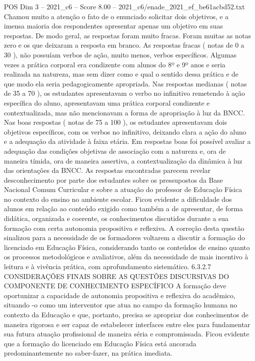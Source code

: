 \begin{textsample}{POS Dim 3 – 2021\_c6 – Score 8.00 – 2021\_c6/enade\_2021\_ef\_be61acbd52.txt}
Chamou muito a atenção o fato de o enunciado solicitar dois objetivos, e a imensa maioria dos respondentes apresentar apenas um objetivo em suas respostas.
De modo geral, as respostas foram muito fracas.
Foram muitas as notas zero e os que deixaram a resposta em branco.
As respostas fracas ( notas de 0 a 30 ), não possuíam verbos de ação, muito menos, verbos específicos.
Algumas vezes a prática corporal era condizente com alunos do 8º e 9º anos e seria realizada na natureza, mas sem dizer como e qual o sentido dessa prática e de que modo ela seria pedagogicamente apropriada.
Nas respostas medianas ( notas de 35 a 70 ), os estudantes apresentavam o verbo no infinitivo remetendo à ação específica do aluno, apresentavam uma prática corporal condizente e contextualizada, mas não mencionavam a forma de apropriação à luz da BNCC.
Nas boas respostas ( notas de 75 a 100 ), os estudantes apresentavam dois objetivos específicos, com os verbos no infinitivo, deixando clara a ação do aluno e a adequação da atividade à faixa etária.
Em respostas boas foi possível avaliar a adequação das condições objetivas de associação com a natureza e, ora de maneira tímida, ora de maneira assertiva, a contextualização da dinâmica à luz das orientações da BNCC.
As respostas encontradas parecem revelar desconhecimento por parte dos estudantes sobre os pressupostos da Base Nacional Comum Curricular e sobre a atuação do professor de Educação Física no contexto do ensino no ambiente escolar.
Ficou evidente a dificuldade dos alunos em relação ao conteúdo exigido como também a de apresentar, de forma didática, organizada e coerente, os conhecimentos discutidos durante a sua formação com certa autonomia propositiva e reflexiva.
A correção desta questão sinalizou para a necessidade de os formadores voltarem a discutir a formação do licenciado em Educação Física, considerando tanto os conteúdos de ensino quanto os processos metodológicos e avaliativos, além da necessidade de mais incentivo à leitura e à vivência prática, com aprofundamento sistemático. 6.3.2.7 CONSIDERAÇÕES FINAIS SOBRE AS QUESTÕES DISCURSIVAS DO COMPONENTE DE CONHECIMENTO ESPECÍFICO A formação deve oportunizar a capacidade de autonomia propositiva e reflexiva do acadêmico, situando -o como um interventor que atua no campo da formação humana no contexto da Educação e que, portanto, precisa se apropriar dos conhecimentos de maneira rigorosa e ser capaz de estabelecer interfaces entre eles para fundamentar sua futura atuação profissional de maneira séria e compromissada.
Ficou evidente que a formação do licenciado em Educação Física está ancorada predominantemente no saber-fazer, na prática imediata.

\end{textsample}
